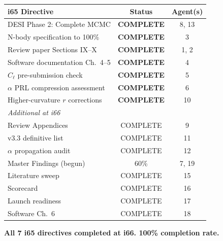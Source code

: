 \documentclass[11pt,a4paper]{article}
\begin{document}
\begin{center}
\begin{longtable}{lcc}
\toprule
\textbf{i65 Directive} & \textbf{Status} & \textbf{Agent(s)} \\
\midrule
DESI Phase 2: Complete MCMC & \textbf{COMPLETE} & 8, 13 \\
N-body specification to 100\% & \textbf{COMPLETE} & 3 \\
Review paper Sections IX--X & \textbf{COMPLETE} & 1, 2 \\
Software documentation Ch.\ 4--5 & \textbf{COMPLETE} & 4 \\
$C_\ell$ pre-submission check & \textbf{COMPLETE} & 5 \\
$\alpha$ PRL compression assessment & \textbf{COMPLETE} & 6 \\
Higher-curvature $r$ corrections & \textbf{COMPLETE} & 10 \\
\midrule
\textit{Additional at i66} & & \\
Review Appendices & COMPLETE & 9 \\
v3.3 definitive list & COMPLETE & 11 \\
$\alpha$ propagation audit & COMPLETE & 12 \\
Master Findings (begun) & 60\% & 7, 19 \\
Literature sweep & COMPLETE & 15 \\
Scorecard & COMPLETE & 16 \\
Launch readiness & COMPLETE & 17 \\
Software Ch.\ 6 & COMPLETE & 18 \\
\bottomrule
\end{longtable}
\end{center}

\textbf{All 7 i65 directives completed at i66. 100\% completion rate.}
\end{document}
